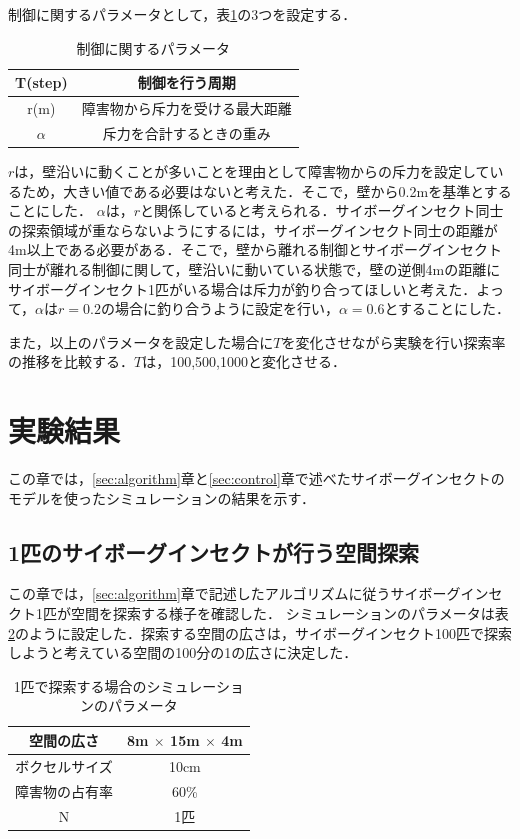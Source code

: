 \documentclass[a4paper,11pt]{jarticle}
\begin{document}
	制御に関するパラメータとして，表\ref{tab:para}の3つを設定する．
	
	\begin{table}
		\centering
		\caption{制御に関するパラメータ}
		\label{tab:para}
		\begin{tabular}{|c|c|}
			\hline
			T(step) & 制御を行う周期 \\ \hline
			r(m) & 障害物から斥力を受ける最大距離 \\ \hline
			$\alpha$ & 斥力を合計するときの重み \\ \hline
		\end{tabular}
	\end{table}

	$r$は，壁沿いに動くことが多いことを理由として障害物からの斥力を設定しているため，大きい値である必要はないと考えた．そこで，壁から0.2mを基準とすることにした．
	$\alpha$は，$r$と関係していると考えられる．サイボーグインセクト同士の探索領域が重ならないようにするには，サイボーグインセクト同士の距離が4m以上である必要がある．そこで，壁から離れる制御とサイボーグインセクト同士が離れる制御に関して，壁沿いに動いている状態で，壁の逆側4mの距離にサイボーグインセクト1匹がいる場合は斥力が釣り合ってほしいと考えた．よって，$\alpha$は$r = 0.2$の場合に釣り合うように設定を行い，$\alpha = 0.6$とすることにした．
	
	また，以上のパラメータを設定した場合に$T$を変化させながら実験を行い探索率の推移を比較する．$T$は，100,500,1000と変化させる．
	\section{実験結果}
	\label{sec:result}
	
	この章では，\ref{sec:algorithm}章と\ref{sec:control}章で述べたサイボーグインセクトのモデルを使ったシミュレーションの結果を示す．
	
	\subsection{1匹のサイボーグインセクトが行う空間探索}
	この章では，\ref{sec:algorithm}章で記述したアルゴリズムに従うサイボーグインセクト1匹が空間を探索する様子を確認した．
	シミュレーションのパラメータは表\ref{tab:ex}のように設定した．探索する空間の広さは，サイボーグインセクト100匹で探索しようと考えている空間の100分の1の広さに決定した．
	
	\begin{table}
		\centering
		\label{tab:ex}
		\caption{1匹で探索する場合のシミュレーションのパラメータ}
		\begin{tabular}{|c|c|}
			\hline
			空間の広さ　& 8m $\times$ 15m $\times$ 4m \\ \hline
			ボクセルサイズ & 10cm \\ \hline
			障害物の占有率 & 60\% \\ \hline
						N & 1匹 \\ \hline
		\end{tabular}
	\end{table}
	
\end{document}
